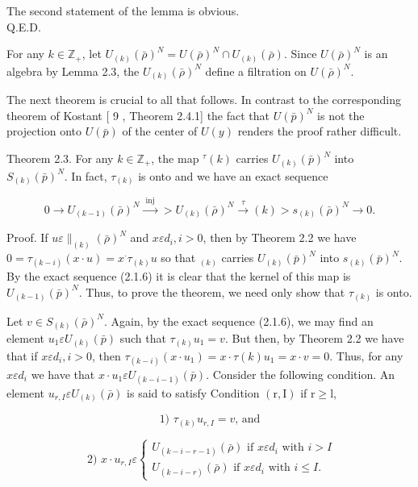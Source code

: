 \documentclass[10pt]{article}
\begin{document}
The second statement of the lemma is obvious.\\
Q.E.D.

For any $k \in \mathbb{Z}_{+}$, let $U_{(k)}(\bar{\rho})^{N}=U(\bar{\rho})^{N} \cap U_{(k)}(\bar{\rho})$. Since $U(\bar{\rho})^{N}$ is an algebra by Lemma 2.3, the $U_{(k)}(\bar{\rho})^{N}$ define a filtration on $U(\bar{\rho})^{N}$.

The next theorem is crucial to all that follows. In contrast to the corresponding theorem of Kostant [ 9 , Theorem 2.4.1] the fact that $U(\bar{p})^{N}$ is not the projection onto $U(\bar{p})$ of the center of $U(y)$ renders the proof rather difficult.

Theorem 2.3. For any $k \in \mathbb{Z}_{+}$, the map ${ }^{\tau}(k)$ carries $U_{(k)}(\bar{p})^{N}$ into $S_{(k)}(\bar{p})^{N}$. In fact, $\tau_{(k)}$ is onto and we have an exact sequence


\begin{equation*}
0 \rightarrow U_{(k-1)}(\bar{\rho})^{N} \xrightarrow{\text { inj }}>U_{(k)}(\bar{\rho})^{N} \xrightarrow{\tau}(k)>s_{(k)}(\bar{\rho})^{N} \rightarrow 0 . \tag{2.3.2}
\end{equation*}


Proof. If $u \varepsilon \|_{(k)}(\bar{\rho})^{N}$ and $x \varepsilon d_{i}, i>0$, then by Theorem 2.2 we have $0=\tau_{(k-i)}(x \cdot u)=x^{\cdot} \tau_{(k)} u$ so that ${ }_{(k)}$ carries $U_{(k)}(\bar{p})^{N}$ into $s_{(k)}(\bar{p})^{N}$. By the exact sequence (2.1.6) it is clear that the kernel of this map is $U_{(k-1)}(\bar{p})^{N}$. Thus, to prove the theorem, we need only show that $\tau_{(k)}$ is onto.

Let $v \in S_{(k)}(\bar{\rho})^{N}$. Again, by the exact sequence (2.1.6), we may find an element $u_{1} \varepsilon U_{(k)}(\bar{p})$ such that $\tau_{(k)} u_{1}=v$. But then, by Theorem 2.2 we have that if $x \varepsilon d_{i}, i>0$, then $\tau_{(k-i)}\left(x \cdot u_{1}\right)=x \cdot \tau(k) u_{1}=x \cdot v=0$. Thus, for any $x \varepsilon d_{i}$ we have that $x \cdot u_{1} \varepsilon U_{(k-i-1)}(\bar{p})$. Consider the following condition. An element $u_{r, I} \varepsilon U_{(k)}(\bar{\rho})$ is said to satisfy Condition $(\mathrm{r}, \mathrm{I})$ if $\mathrm{r} \geq \mathrm{l}$,

$$
\text { 1) } \tau_{(k)} u_{r, I}=v \text {, and }
$$

\[
\text { 2) } x \cdot u_{r, I} \varepsilon\left\{\begin{array}{l}
U_{(k-i-r-1)}(\bar{\rho}) \text { if } x \varepsilon d_{i} \text { with } i>I  \tag{2.3.3}\\
U_{(k-i-r)}(\bar{\rho}) \text { if } x \varepsilon d_{i} \text { with } i \leq I .
\end{array}\right.
\]
\end{document}
